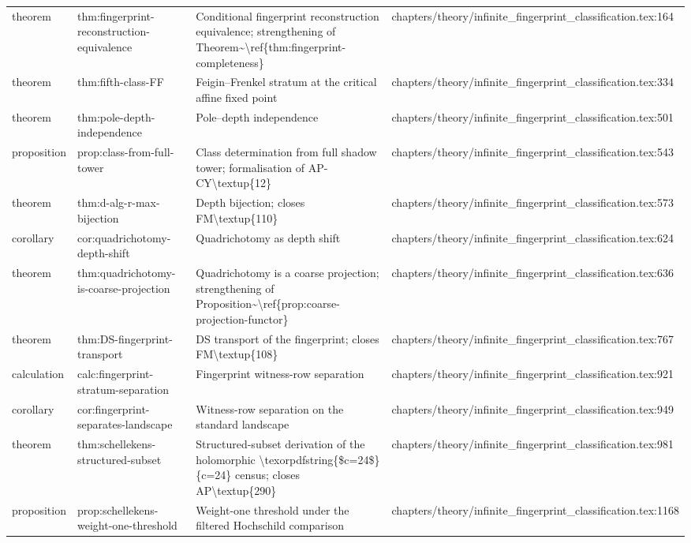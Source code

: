 \documentclass[11pt]{article}
\begin{document}
\begin{longtable}{L{0.10\textwidth}L{0.26\textwidth}L{0.42\textwidth}L{0.22\textwidth}}
theorem & thm:fingerprint-reconstruction-equivalence & Cond{}itional fingerprint reconstruction equivalence; strengthening of Theorem\textasciitilde{}\textbackslash{}ref\{thm:fingerprint-completeness\} & chapters/theory/infinite\_fingerprint\_classification.tex:164\\
theorem & thm:fifth-class-FF & Feigin--Frenkel stratum at the critical affine fixed point & chapters/theory/infinite\_fingerprint\_classification.tex:334\\
theorem & thm:pole-depth-independence & Pole--depth independence & chapters/theory/infinite\_fingerprint\_classification.tex:501\\
proposition & prop:class-from-full-tower & Class determination from full shadow tower; formalisation of AP-CY\textbackslash{}textup\{12\} & chapters/theory/infinite\_fingerprint\_classification.tex:543\\
theorem & thm:d-alg-r-max-bijection & Depth bijection; closes FM\textbackslash{}textup\{110\} & chapters/theory/infinite\_fingerprint\_classification.tex:573\\
corollary & cor:quadrichotomy-depth-shift & Quadrichotomy as depth shift & chapters/theory/infinite\_fingerprint\_classification.tex:624\\
theorem & thm:quadrichotomy-is-coarse-projection & Quadrichotomy is a coarse projection; strengthening of Proposition\textasciitilde{}\textbackslash{}ref\{prop:coarse-projection-functor\} & chapters/theory/infinite\_fingerprint\_classification.tex:636\\
theorem & thm:DS-fingerprint-transport & DS transport of the fingerprint; closes FM\textbackslash{}textup\{108\} & chapters/theory/infinite\_fingerprint\_classification.tex:767\\
calculation & calc:fingerprint-stratum-separation & Fingerprint witness-row separation & chapters/theory/infinite\_fingerprint\_classification.tex:921\\
corollary & cor:fingerprint-separates-landscape & Witness-row separation on the standard landscape & chapters/theory/infinite\_fingerprint\_classification.tex:949\\
theorem & thm:schellekens-structured-subset & Structured-subset derivation of the holomorphic \textbackslash{}texorpdfstring\{\$c=24\$\}\{c=24\} census; closes AP\textbackslash{}textup\{290\} & chapters/theory/infinite\_fingerprint\_classification.tex:981\\
proposition & prop:schellekens-weight-one-threshold & Weight-one threshold under the filtered Hochschild comparison & chapters/theory/infinite\_fingerprint\_classification.tex:1168\\

\end{longtable}
\end{document}
